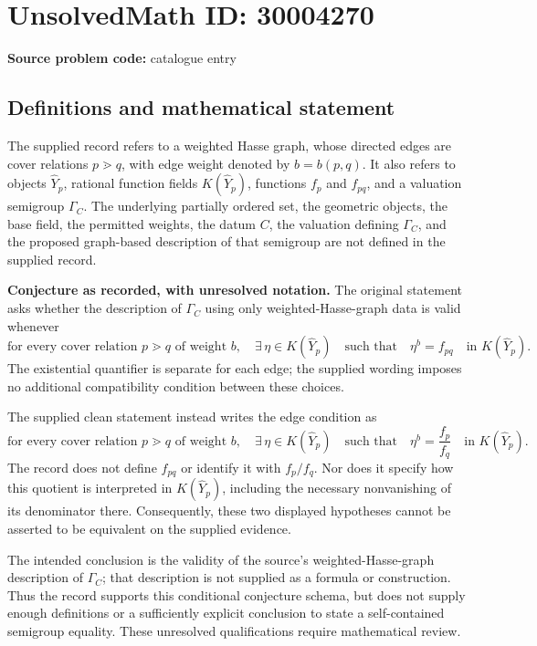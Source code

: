 \documentclass[11pt]{article}
\begin{document}
\section*{UnsolvedMath ID: 30004270}
\textbf{Source problem code:} catalogue entry
\subsection{Definitions and mathematical statement}
The supplied record refers to a weighted Hasse graph, whose directed edges are cover relations \(p\gtrdot q\), with edge weight denoted by \(b=b(p,q)\). It also refers to objects \(\widehat Y_p\), rational function fields \(K(\widehat Y_p)\), functions \(f_p\) and \(f_{pq}\), and a valuation semigroup \(\Gamma_C\). The underlying partially ordered set, the geometric objects, the base field, the permitted weights, the datum \(C\), the valuation defining \(\Gamma_C\), and the proposed graph-based description of that semigroup are not defined in the supplied record.

\textbf{Conjecture as recorded, with unresolved notation.} The original statement asks whether the description of \(\Gamma_C\) using only weighted-Hasse-graph data is valid whenever
\[
\text{for every cover relation }p\gtrdot q\text{ of weight }b,
\quad \exists\,\eta\in K(\widehat Y_p)
\quad\text{such that}\quad
\eta^{b}=f_{pq}
\quad\text{in }K(\widehat Y_p).
\]
The existential quantifier is separate for each edge; the supplied wording imposes no additional compatibility condition between these choices.

The supplied clean statement instead writes the edge condition as
\[
\text{for every cover relation }p\gtrdot q\text{ of weight }b,
\quad \exists\,\eta\in K(\widehat Y_p)
\quad\text{such that}\quad
\eta^{b}=\frac{f_p}{f_q}
\quad\text{in }K(\widehat Y_p).
\]
The record does not define \(f_{pq}\) or identify it with \(f_p/f_q\). Nor does it specify how this quotient is interpreted in \(K(\widehat Y_p)\), including the necessary nonvanishing of its denominator there. Consequently, these two displayed hypotheses cannot be asserted to be equivalent on the supplied evidence.

The intended conclusion is the validity of the source's weighted-Hasse-graph description of \(\Gamma_C\); that description is not supplied as a formula or construction. Thus the record supports this conditional conjecture schema, but does not supply enough definitions or a sufficiently explicit conclusion to state a self-contained semigroup equality. These unresolved qualifications require mathematical review.
\end{document}
